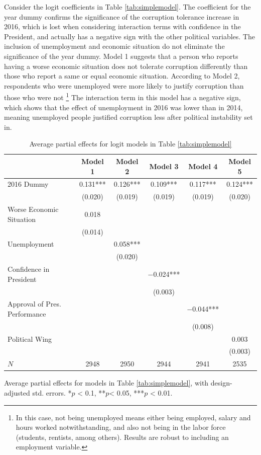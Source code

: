 \documentclass[12pt,a4]{article}\usepackage[]{graphicx}\usepackage[]{xcolor}
\begin{document}
Consider the logit coefficients in Table \ref{tab:simplemodel}. The coefficient for the year dummy confirms the significance of the corruption tolerance increase in 2016, which is lost when considering interaction terms with confidence in the President, and actually has a negative sign with the other political variables. The inclusion of unemployment and economic situation do not eliminate the significance of the year dummy. Model 1 suggests that a person who reports having a worse economic situation does not tolerate corruption differently than those who report a same or equal economic situation. According to Model 2, respondents who were unemployed were more likely to justify corruption than those who were not \footnote{In this case, not being unemployed means either being employed, salary and hours worked notwithstanding, and also not being in the labor force (students, rentists, among others). Results are robust to including an employment variable.} The interaction term in this model has a negative sign, which shows that the effect of unemployment in 2016 was lower than in 2014, meaning unemployed people justified corruption less after political instability set in. 

\begin{table}[htbp!]
\caption{Average partial effects for logit models in Table \ref{tab:simplemodel}}
\label{tab:apesimp}

\begin{tabular}[t]{lccccc}
\toprule
  & Model 1 & Model 2 & Model 3 & Model 4 & Model 5\\
\midrule
2016 Dummy & \num{0.131}*** & \num{0.126}*** & \num{0.109}*** & \num{0.117}*** & \num{0.124}***\\
 & (\num{0.020}) & (\num{0.019}) & (\num{0.019}) & (\num{0.019}) & (\num{0.020})\\
Worse Economic Situation & \num{0.018} &  &  &  & \\
 & (\num{0.014}) &  &  &  & \\
Unemployment &  & \num{0.058}*** &  &  & \\
 &  & (\num{0.020}) &  &  & \\
Confidence in President &  &  & \num{-0.024}*** &  & \\
 &  &  & (\num{0.003}) &  & \\
Approval of Pres. Performance &  &  &  & \num{-0.044}*** & \\
 &  &  &  & (\num{0.008}) & \\
Political Wing &  &  &  &  & \num{0.003}\\
 &  &  &  &  & (\num{0.003})\\
\midrule
$N$ & \num{2948} & \num{2950} & \num{2944} & \num{2941} & \num{2535}\\
\bottomrule
\end{tabular}


\vspace{0.15cm}
Average partial effects for models in Table \ref{tab:simplemodel}, with design-adjusted std. errors. *$p$ < 0.1, **$p$< 0.05, ***$p$ < 0.01.
\end{table}
\end{document}
